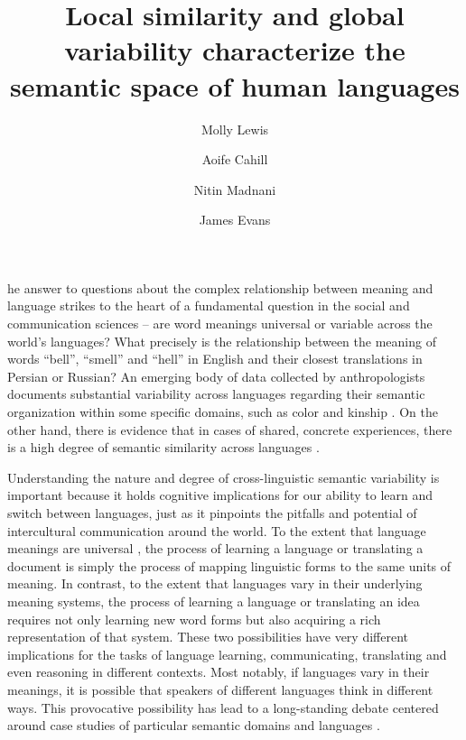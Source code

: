 \documentclass[9pt,twocolumn,twoside,lineno]{pnas-new}
\title{Local similarity and global variability characterize the semantic space of human languages}
\author[a,1]{Molly Lewis}
\author[b]{Aoife Cahill}
\author[b]{Nitin Madnani}
\author[c,d,1]{James Evans}
\affil[a]{Carnegie Mellon University}
\affil[b]{Educational Testing Service}
\affil[c]{University of Chicago}
\affil[d]{Santa Fe Institute}
\begin{document}
\maketitle
\thispagestyle{firststyle}

he answer to questions about the complex relationship between meaning and language strikes to the heart of a fundamental question in the social and communication sciences -- are word meanings universal or variable across the world's languages? What precisely is the relationship between the meaning of words ``bell'', ``smell” and ``hell'' in English and their closest translations in Persian or Russian? An emerging body of data collected by anthropologists documents substantial variability across languages regarding their semantic organization within some specific domains, such as color \cite{berlin1991basic} and kinship \cite{murdock1970kin}. On the other hand, there is evidence that in cases of shared, concrete experiences, there is a high degree of semantic similarity across languages \cite{youn2016universal}.

Understanding the nature and degree of cross-linguistic semantic variability is important because it holds cognitive implications for our ability to learn and switch between languages, just as it pinpoints the pitfalls and potential of intercultural communication around the world. To the extent that language meanings are universal \cite{wierzbicka1996semantics,fodor1975language}, the process of learning a language or translating a document is simply the process of mapping linguistic forms to the same units of meaning. In contrast, to the extent that languages vary in their underlying meaning systems, the process of learning a language or translating an idea requires not only learning new word forms but also acquiring a rich representation of that system. These two possibilities have very different implications for the tasks of language learning, communicating, translating and even reasoning in different contexts. Most notably, if languages vary in their meanings, it is possible that speakers of different languages think in different ways. This provocative possibility has lead to a long-standing debate centered around case studies of particular semantic domains and languages \cite{winawer2007russian,gennari2002motion,brown1993uphill}.
\end{document}
